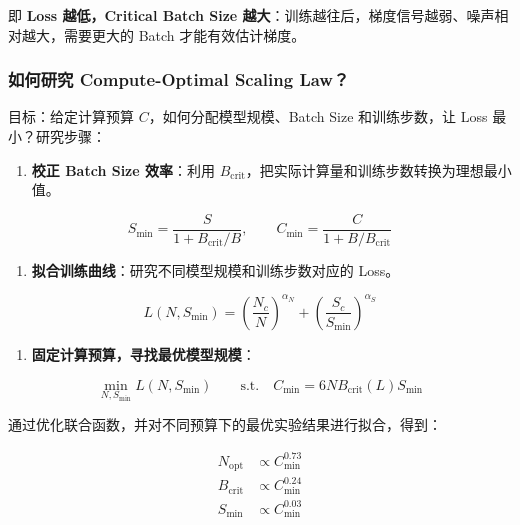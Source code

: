 \documentclass[
  11pt,
  a4paper,
  fontset=none]{ctexart}
\providecommand{\tightlist}{%
  \setlength{\itemsep}{0pt}\setlength{\parskip}{0pt}}
\newenvironment{NotesFormula}{%
  \par\noindent\begin{minipage}{\linewidth}%
  \setlength{\parindent}{2em}%
  \setlength{\parskip}{0.35em}%
}{\end{minipage}\par}
\begin{document}
即 \textbf{Loss 越低，Critical Batch Size
越大}：训练越往后，梯度信号越弱、噪声相对越大，需要更大的 Batch
才能有效估计梯度。

\subsubsection{如何研究 Compute-Optimal Scaling
Law？}\label{ux5982ux4f55ux7814ux7a76-compute-optimal-scaling-law}

目标：给定计算预算 \(C\)，如何分配模型规模、Batch Size 和训练步数，让
Loss 最小？研究步骤：

\begin{enumerate}
\def\labelenumi{\arabic{enumi}.}
\tightlist
\item
  \textbf{校正 Batch Size 效率}：利用
  \(B_{\mathrm{crit}}\)，把实际计算量和训练步数转换为理想最小值。
\end{enumerate}

\[S_{\min}=\frac{S}{1+B_{\mathrm{crit}}/B},\qquad
C_{\min}=\frac{C}{1+B/B_{\mathrm{crit}}}\]

\begin{enumerate}
\def\labelenumi{\arabic{enumi}.}
\setcounter{enumi}{1}
\tightlist
\item
  \textbf{拟合训练曲线}：研究不同模型规模和训练步数对应的 Loss。
\end{enumerate}

\[\boxed{L(N,S_{\min})=\left(\frac{N_c}{N}\right)^{\alpha_N}+\left(\frac{S_c}{S_{\min}}\right)^{\alpha_S}}\]

\begin{enumerate}
\def\labelenumi{\arabic{enumi}.}
\setcounter{enumi}{2}
\tightlist
\item
  \textbf{固定计算预算，寻找最优模型规模}：
\end{enumerate}

\[\min_{N,S_{\min}}L(N,S_{\min})\qquad
\text{s.t.}\quad C_{\min}=6NB_{\mathrm{crit}}(L)S_{\min}\]

\begin{NotesFormula}

通过优化联合函数，并对不同预算下的最优实验结果进行拟合，得到：

\[\boxed{
\begin{aligned}
N_{\mathrm{opt}}&\propto C_{\min}^{0.73}\\
B_{\mathrm{crit}}&\propto C_{\min}^{0.24}\\
S_{\min}&\propto C_{\min}^{0.03}
\end{aligned}}\]

\end{NotesFormula}
\end{document}
